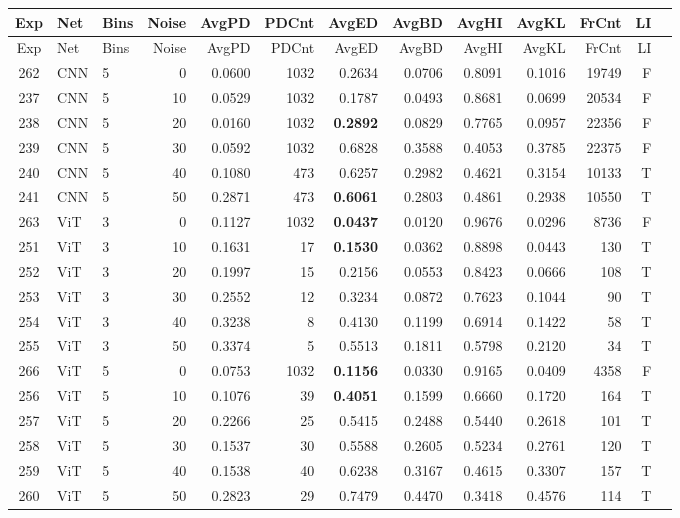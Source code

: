 \begin{longtable}{@{}cllrrrrrrrrrc@{}}
\toprule
Exp & Net & Bins & Noise & AvgPD & PDCnt & AvgED & AvgBD & AvgHI & AvgKL & FrCnt & LI \\
\midrule
\endfirsthead
\toprule
Exp & Net & Bins & Noise & AvgPD & PDCnt & AvgED & AvgBD & AvgHI & AvgKL & FrCnt & LI \\
\midrule
\endhead
262 & CNN & 5 & 0 & 0.0600 & 1032 & 0.2634 & 0.0706 & 0.8091 & 0.1016 & 19749 & F \\
237 & CNN & 5 & 10 & 0.0529 & 1032 & 0.1787 & 0.0493 & 0.8681 & 0.0699 & 20534 & F \\
238 & CNN & 5 & 20 & 0.0160 & 1032 & \textbf{0.2892} & 0.0829 & 0.7765 & 0.0957 & 22356 & F \\
239 & CNN & 5 & 30 & 0.0592 & 1032 & 0.6828 & 0.3588 & 0.4053 & 0.3785 & 22375 & F \\
240 & CNN & 5 & 40 & 0.1080 & 473 & 0.6257 & 0.2982 & 0.4621 & 0.3154 & 10133 & T \\
241 & CNN & 5 & 50 & 0.2871 & 473 & \textbf{0.6061} & 0.2803 & 0.4861 & 0.2938 & 10550 & T \\
263 & ViT & 3 & 0 & 0.1127 & 1032 & \textbf{0.0437} & 0.0120 & 0.9676 & 0.0296 & 8736 & F \\
251 & ViT & 3 & 10 & 0.1631 & 17 & \textbf{0.1530} & 0.0362 & 0.8898 & 0.0443 & 130 & T \\
252 & ViT & 3 & 20 & 0.1997 & 15 & 0.2156 & 0.0553 & 0.8423 & 0.0666 & 108 & T \\
253 & ViT & 3 & 30 & 0.2552 & 12 & 0.3234 & 0.0872 & 0.7623 & 0.1044 & 90 & T \\
254 & ViT & 3 & 40 & 0.3238 & 8 & 0.4130 & 0.1199 & 0.6914 & 0.1422 & 58 & T \\
255 & ViT & 3 & 50 & 0.3374 & 5 & 0.5513 & 0.1811 & 0.5798 & 0.2120 & 34 & T \\
266 & ViT & 5 & 0 & 0.0753 & 1032 & \textbf{0.1156} & 0.0330 & 0.9165 & 0.0409 & 4358 & F \\
256 & ViT & 5 & 10 & 0.1076 & 39 & \textbf{0.4051} & 0.1599 & 0.6660 & 0.1720 & 164 & T \\
257 & ViT & 5 & 20 & 0.2266 & 25 & 0.5415 & 0.2488 & 0.5440 & 0.2618 & 101 & T \\
258 & ViT & 5 & 30 & 0.1537 & 30 & 0.5588 & 0.2605 & 0.5234 & 0.2761 & 120 & T \\
259 & ViT & 5 & 40 & 0.1538 & 40 & 0.6238 & 0.3167 & 0.4615 & 0.3307 & 157 & T \\
260 & ViT & 5 & 50 & 0.2823 & 29 & 0.7479 & 0.4470 & 0.3418 & 0.4576 & 114 & T \\

\end{longtable}
